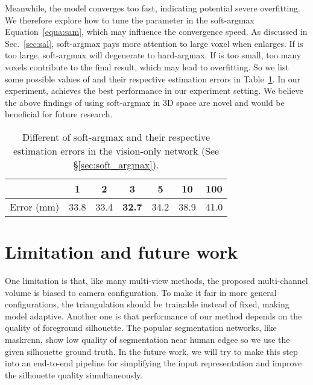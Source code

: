 \documentclass[10pt,twocolumn,letterpaper]{article}
\begin{document}
Meanwhile, the model converges too fast, indicating potential severe overfitting. We therefore explore how to tune the parameter  in the soft-argmax Equation~\ref{equa:sam}, which may influence the convergence speed. As discussed in Sec.~\ref{sec:sal}, soft-argmax pays more attention to large voxel when  enlarges. If  is too large, soft-argmax will degenerate to hard-argmax. If  is too small, too many voxels contribute to the final result, which may lead to overfitting. So we list some possible values of  and their respective estimation errors in Table~\ref{tab:sfk}. In our experiment,  achieves the best performance in our experiment setting. We believe the above findings of using soft-argmax in 3D space are novel and would be beneficial for future research. 


\begin{table}[]
\begin{tabular}{|l|c|c|c|c|c|c|}
\hline
        & 1    & 2    & 3   & 5    & 10   & 100  \\ \hline
Error (mm) & 33.8 & 33.4 & \textbf{32.7} & 34.2 & 38.9 & 41.0 \\ \hline
\end{tabular}
\caption{Different  of soft-argmax and their respective estimation errors in the vision-only network (See \S\ref{sec:soft_argmax}).}
\label{tab:sfk}
\vspace*{-14pt}
\end{table}
\section{Limitation and future work}
\label{sec:limit}


One limitation is that, like many multi-view methods, the proposed multi-channel volume is biased to camera configuration. To make it fair in more general configurations, the triangulation should be trainable instead of fixed, making model adaptive. Another one is that performance of our method depends on the quality of foreground silhouette. The popular segmentation networks, like maskrcnn\cite{he2017mask}, show low quality of segmentation near human edgee so we use the given silhouette ground truth. In the future work, we will try to make this step into an end-to-end pipeline for simplifying the input representation and improve the silhouette quality simultaneously.
\end{document}
